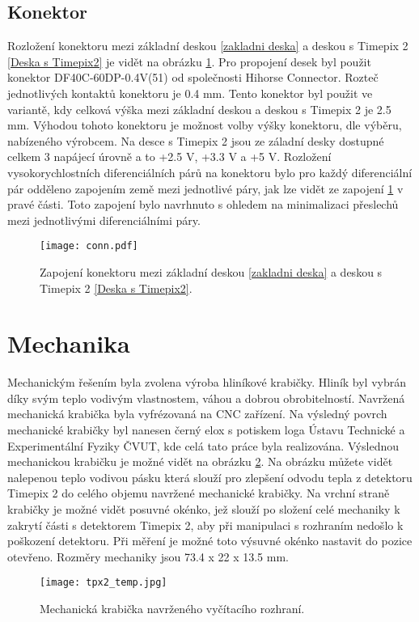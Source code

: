 	\subsection{Konektor}	%
	\label{konektor}
	Rozložení konektoru mezi základní deskou \ref{zakladni deska} a deskou s Timepix 2 \ref{Deska s Timepix2} je vidět na obrázku \ref{fig:konektor}. Pro propojení desek byl použit konektor DF40C-60DP-0.4V(51) od společnosti Hihorse Connector. Rozteč jednotlivých kontaktů konektoru je 0.4 mm. Tento konektor byl použit ve variantě, kdy celková výška mezi základní deskou a deskou s Timepix 2 je 2.5 mm. Výhodou tohoto konektoru je možnost volby výšky konektoru, dle výběru, nabízeného výrobcem. Na desce s Timepix 2 jsou ze záladní desky dostupné celkem 3 napájecí úrovně a to +2.5 V, +3.3 V a +5 V. Rozložení vysokorychlostních diferenciálních párů na konektoru bylo pro každý diferenciální pár odděleno zapojením země mezi jednotlivé páry, jak lze vidět ze zapojení \ref{fig:konektor} v pravé části. Toto zapojení bylo navrhnuto s ohledem na minimalizaci přeslechů mezi jednotlivými diferenciálními páry.
	\begin{figure}[h!]
		\centering
		\captionsetup{justification=centering}
		\texttt{[image: conn.pdf]}
		\caption{Zapojení konektoru mezi základní deskou \ref{zakladni deska} a deskou s Timepix 2 \ref{Deska s Timepix2}.} 
		\label{fig:konektor}
	\end{figure} 
	
\section{Mechanika}
	Mechanickým řešením byla zvolena výroba hliníkové krabičky. Hliník byl vybrán díky svým teplo vodivým vlastnostem, váhou a dobrou obrobitelností. Navržená mechanická krabička byla vyfrézovaná na CNC zařízení. Na výsledný povrch mechanické krabičky byl nanesen černý elox s potiskem loga Ústavu Technické a Experimentální Fyziky ČVUT, kde celá tato práce byla realizována. Výslednou mechanickou krabičku je možné vidět na obrázku \ref{fig:mechanika}. Na obrázku můžete vidět nalepenou teplo vodivou pásku která slouží pro zlepšení odvodu tepla z detektoru Timepix 2 do celého objemu navržené mechanické krabičky. Na vrchní straně krabičky je možné vidět posuvné okénko, jež slouží po složení celé mechaniky k zakrytí části s detektorem Timepix 2, aby při manipulaci s rozhraním nedošlo k poškození detektoru. Při měření je možné toto výsuvné okénko nastavit do pozice otevřeno. Rozměry mechaniky jsou 73.4 x 22 x 13.5 mm. 
	\begin{figure}[h!]
		\centering
		\captionsetup{justification=centering}
		\texttt{[image: tpx2\_temp.jpg]}
		\caption{Mechanická krabička navrženého vyčítacího rozhraní.} 
		\label{fig:mechanika}
	\end{figure}

